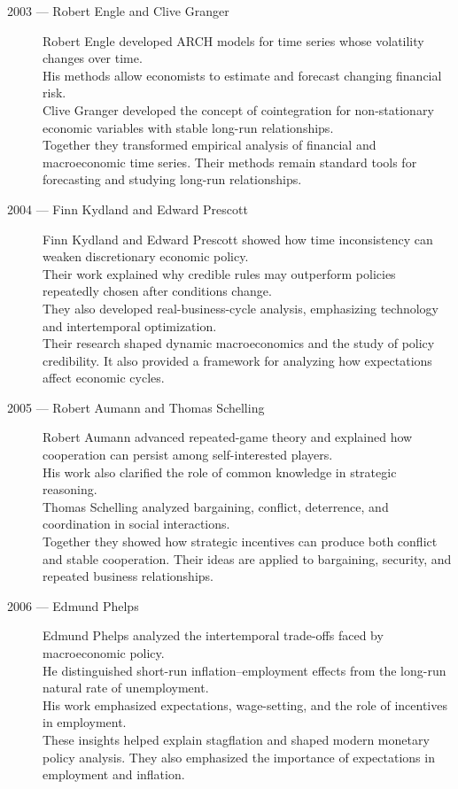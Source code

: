 \documentclass[12pt]{report}
\begin{document}
{\begin{description}
\item[2003 --- Robert Engle and Clive Granger]
Robert Engle developed ARCH models for time series whose volatility changes over time.\\
His methods allow economists to estimate and forecast changing financial risk.\\
Clive Granger developed the concept of cointegration for non-stationary economic variables with stable long-run relationships.\\
Together they transformed empirical analysis of financial and macroeconomic time series. Their methods remain standard tools for forecasting and studying long-run relationships.

\item[2004 --- Finn Kydland and Edward Prescott]
Finn Kydland and Edward Prescott showed how time inconsistency can weaken discretionary economic policy.\\
Their work explained why credible rules may outperform policies repeatedly chosen after conditions change.\\
They also developed real-business-cycle analysis, emphasizing technology and intertemporal optimization.\\
Their research shaped dynamic macroeconomics and the study of policy credibility. It also provided a framework for analyzing how expectations affect economic cycles.

\item[2005 --- Robert Aumann and Thomas Schelling]
Robert Aumann advanced repeated-game theory and explained how cooperation can persist among self-interested players.\\
His work also clarified the role of common knowledge in strategic reasoning.\\
Thomas Schelling analyzed bargaining, conflict, deterrence, and coordination in social interactions.\\
Together they showed how strategic incentives can produce both conflict and stable cooperation. Their ideas are applied to bargaining, security, and repeated business relationships.

\item[2006 --- Edmund Phelps]
Edmund Phelps analyzed the intertemporal trade-offs faced by macroeconomic policy.\\
He distinguished short-run inflation--employment effects from the long-run natural rate of unemployment.\\
His work emphasized expectations, wage-setting, and the role of incentives in employment.\\
These insights helped explain stagflation and shaped modern monetary policy analysis. They also emphasized the importance of expectations in employment and inflation.


\end{description}}
\end{document}
